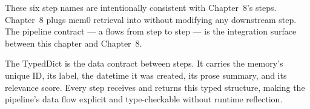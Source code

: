 \begin{notebox}
These six step names are intentionally consistent with Chapter~8's
 steps. Chapter~8 plugs mem0 retrieval into
 without modifying any downstream step.
The pipeline contract --- a  flows from step
to step --- is the integration surface between this chapter and
Chapter~8.
\end{notebox}

The  TypedDict is the data contract between steps.
It carries the memory's unique ID, its  label, the
datetime it was created, its prose summary, and its relevance score.
Every step receives and returns this typed structure, making the
pipeline's data flow explicit and type-checkable without runtime
reflection.

